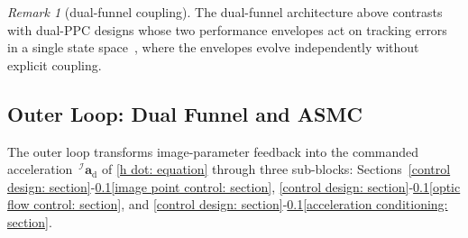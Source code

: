 \documentclass{IEEEtaes}
\theoremstyle{definition}
\theoremstyle{remark}
\newtheorem{remark}{Remark}
\begin{document}
\begin{remark}[dual-funnel coupling]\label{rem:dualfunnel} The dual-funnel architecture above contrasts with dual-PPC designs whose two performance envelopes act on tracking errors in a single state space~\cite{lin2022}, where the envelopes evolve independently without explicit coupling.\end{remark}

\subsection{Outer Loop: Dual Funnel and ASMC} \label{outer loop: section}
The outer loop transforms image-parameter feedback into the commanded acceleration $\,^\mathcal{I}\boldsymbol{a}_\text{d}$ of \eqref{h dot: equation} through three sub-blocks: Sections~\ref{control design: section}-\ref{outer loop: section}\ref{image point control: section}, \ref{control design: section}-\ref{outer loop: section}\ref{optic flow control: section}, and \ref{control design: section}-\ref{outer loop: section}\ref{acceleration conditioning: section}.
\end{document}
